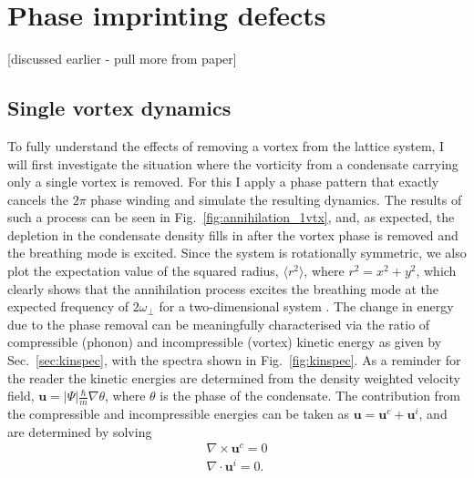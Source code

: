 \section{Phase imprinting defects}\label{sec:phase}

[discussed earlier - pull more from paper]

\subsection{Single vortex dynamics}

To fully understand the effects of removing a vortex from the lattice system, I will first investigate the situation where the vorticity from a condensate carrying only a single vortex is removed. For this I apply a phase pattern that exactly cancels the $2\pi$ phase winding and simulate the resulting dynamics. The results of such a process can be seen in Fig.~\ref{fig:annihilation_1vtx}, and, as expected, the depletion in the condensate density fills in after the vortex phase is removed and the breathing mode is excited. Since the system is rotationally symmetric, we also plot the expectation value of the squared radius, $\langle r^2 \rangle$, where $r^2 = x^2 + y^2$, which clearly shows that the annihilation process excites the breathing mode at the expected frequency of $2\omega_\perp$ for a two-dimensional system \cite{BEC:Pitaevskii_pra_1997}. The change in energy due to the phase removal can be meaningfully characterised via the ratio of compressible (phonon) and incompressible (vortex) kinetic energy as given by Sec.~\ref{sec:kinspec}, with the spectra shown in Fig.~\ref{fig:kinspec}. As a reminder for the reader the kinetic energies are determined from the density weighted velocity field, $\mathbf{u} = |\Psi|\frac{\hbar}{m}\nabla \theta$, where $\theta$ is the phase of the condensate. The contribution from the compressible and incompressible energies can be taken as $\mathbf{u} = \mathbf{u}^{c} + \mathbf{u}^{i}$, and are determined by solving
\begin{subequations}
    \begin{align}
        \nabla \times \mathbf{u}^{c} = 0 \\
        \nabla \cdot \mathbf{u}^{i} = 0.
    \end{align}
\end{subequations}
